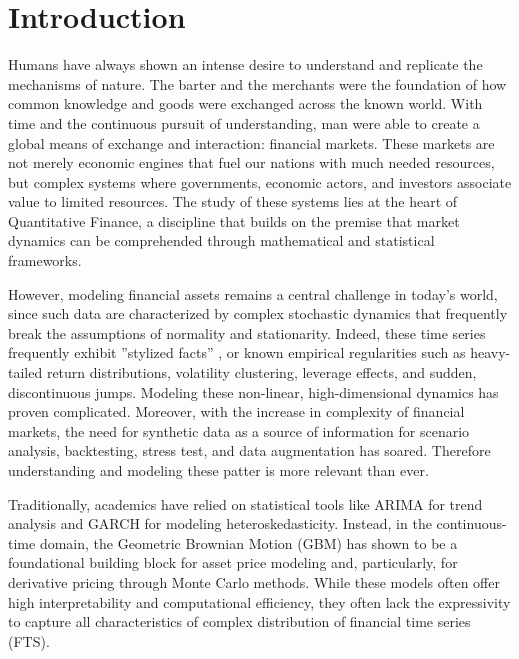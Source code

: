 \chapter{Introduction}
Humans have always shown an intense desire to understand and replicate the mechanisms of nature. The barter and the merchants were the foundation of how common knowledge and goods were exchanged across the known world. With time and the continuous pursuit
of understanding, man were able to create a global means of exchange and interaction: financial markets. These markets are not merely economic engines that fuel our nations with much needed resources, but complex systems where governments, economic actors, and investors associate value to limited resources. The study of these systems lies at
the heart of Quantitative Finance, a discipline that builds on the premise that market dynamics can be comprehended through mathematical and statistical frameworks. 

However, modeling financial assets remains a central challenge in today’s world, since such data are characterized by complex stochastic dynamics that frequently break the assumptions of normality and stationarity. Indeed, these time series frequently exhibit
”stylized facts” \cite{cont2001empirical}, or known empirical regularities such as heavy-tailed return distributions, volatility clustering, leverage effects, and sudden, discontinuous jumps. Modeling these non-linear, high-dimensional dynamics has proven complicated. Moreover, with the increase in complexity of financial markets, the need for synthetic data as a source of information for scenario analysis, backtesting, stress test, and data augmentation has soared. Therefore understanding and modeling these patter is more relevant than ever.

Traditionally, academics have relied on statistical tools like ARIMA \cite{box1970time} for trend analysis
and GARCH \cite{bollerslev1986generalized} for modeling heteroskedasticity. Instead, in the continuous-time domain,
the Geometric Brownian Motion (GBM) has shown to be a foundational building block
for asset price modeling and, particularly, for derivative pricing through Monte Carlo
methods. While these models often offer high interpretability and computational efficiency, they often lack the expressivity to capture all characteristics of complex distribution of financial time series (FTS). 

